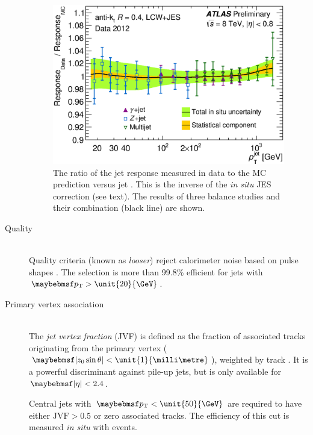\begin{description}
	\begin{figure}
		\includegraphics[width=\mediumfigwidth]{tex/selection/jet_insitu_corr}
		\caption{The ratio of the jet response measured in data to the MC prediction 
		versus jet \pt. This is the inverse of the \textit{in situ} JES correction (see 
		text). The results of three \pt balance studies and their combination (black line)
		are shown.}
		\label{fig:objects:jet_insitu}
	\end{figure}

\item[Quality] \hfill \\
	Quality criteria (known as \textit{looser}) reject calorimeter noise based on 
	pulse shapes \cite{Jets:Quality:2011}. The selection is more than 99.8\% efficient 
	for jets with $\pt > \unit{20}{\GeV}$.

\item[Primary vertex association] \hfill \\
	The \textit{jet vertex fraction} (JVF) is defined as the fraction of associated tracks 
	originating from the primary vertex ($\mods{z_0 \sin\theta} < \unit{1}{\milli\metre}$), 
	weighted by track \pt \cite{Jets:PileupCorrection:2012}. It is a powerful discriminant 
	against pile-up jets, but is only available for $\mods{\eta} < 2.4$.

	Central jets with $\pt < \unit{50}{\GeV}$ are required to have either 
	$\text{JVF} > 0.5$ or zero associated tracks. The efficiency of this cut is measured 
	\textit{in situ} with \Zjets events.

\end{description}



